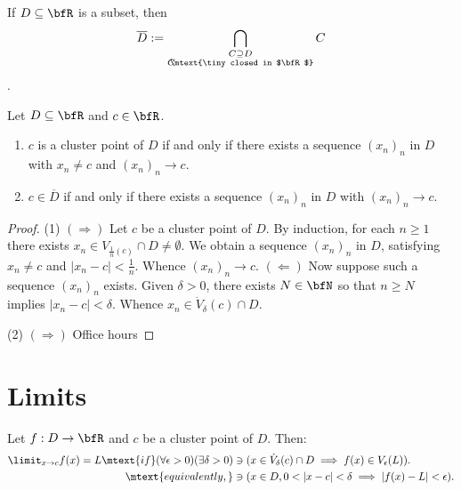     \begin{definition}
        If $D \subseteq \bfR$ is a subset, then $$\displaystyle \overline{D}:=\bigcap_{\substack{C \supseteq D \\ C\hspace{-4pt}\mtext{\tiny closed in $\bfR$}}}C$$.
    \end{definition}

    \begin{proposition}
        Let $D \subseteq \bfR$ and $c \in \bfR$.
            \begin{enumerate}[label = (\arabic*)]
                \item $c$ is a cluster point of $D$ if and only if there exists a sequence $(x_n)_n$ in $D$ with $x_n \neq c$ and $(x_n)_n \rightarrow c$.
                \item $c \in \overline{D}$ if and only if there exists a sequence $(x_n)_n$ in $D$ with $(x_n)_n \rightarrow c$.
            \end{enumerate}
    \end{proposition}
        \begin{proof}
            (1) $(\Rightarrow)$ Let $c$ be a cluster point of $D$. By induction, for each $n \geq 1$ there exists $x_n \in V_{\frac{1}{n}(c)}\cap D \neq \emptyset$. We obtain a sequence $(x_n)_n$ in $D$, satisfying $x_n \neq c$ and $|x_n - c| < \frac{1}{n}$. Whence $(x_n)_n \rightarrow c$. $(\Leftarrow)$ Now suppose such a sequence $(x_n)_n$ exists. Given $\delta > 0$, there exists $N \in \bfN$ so that $n \geq N$ implies $|x_n - c| < \delta$. Whence $x_n \in \dot{V}_\delta(c) \cap D$.

            (2) $(\Rightarrow)$ {\color{red} Office hours}
        \end{proof}

\section{Limits}
    \begin{definition}
        Let $f:D \rightarrow \bfR$ and $c$ be a cluster point of $D$. Then:
            \begin{equation*}
            \begin{split}
                \limit_{x \rightarrow c}f(x) = L \mtext{if} (\forall \epsilon > 0)(\exists \delta  > 0)&\ni (x \in \dot{V}_\delta(c) \cap D \implies f(x) \in V_\epsilon(L)).\\
                \mtext{equivalently,} &\ni (x \in D, 0 < |x-c| < \delta \implies |f(x)-L| < \epsilon).
            \end{split}
            \end{equation*}
    \end{definition}

